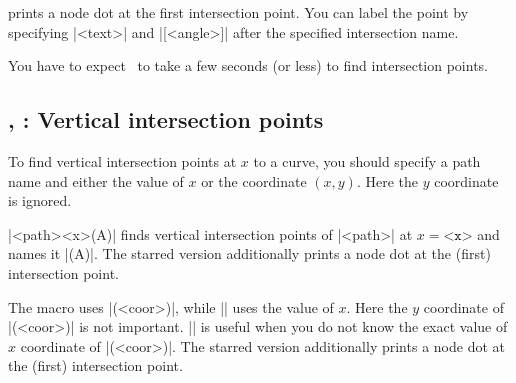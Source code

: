\begin{tzcode}{.3}
\end{tzcode}

\icmd{\tzXpoint*} prints a node dot at the first intersection point.
You can label the point by specifying |{<text>}| and |[<angle>]| after the specified intersection name.

\begin{tzcode}{.3}
\end{tzcode}

\remark
You have to expect \Tikz\ to take a few seconds (or less) to find intersection points.

\subsection{\protect\cmd{\tzvXpointat(*)}, \protect\cmd{\tzvXpoint(*)}: Vertical intersection points}
\label{ssi:tzvXpoint}

To find vertical intersection points at $x$ to a curve, you should specify a path name and either the value of $x$ or the coordinate $(x,y)$. Here the $y$ coordinate is ignored.

\icmd{\tzvXpointat}|{<path>}{<x>}(A)| finds vertical intersection points of |<path>| at  $x=\texttt{<x>}$ and names it |(A)|.
The starred version \icmd{\tzvXpointat*} additionally prints a node dot at the (first) intersection point.

The macro \icmd{\tzvXpoint} uses |(<coor>)|, while |\tzvXpointat| uses the value of $x$. Here the $y$ coordinate of |(<coor>)| is not important. |\tzvXpoint| is useful when you do not know the exact value of $x$ coordinate of |(<coor>)|.
The starred version \icmd{\tzvXpoint*} additionally prints a node dot at the (first) intersection point.


\begin{tzcode}{.3}
\end{tzcode}


